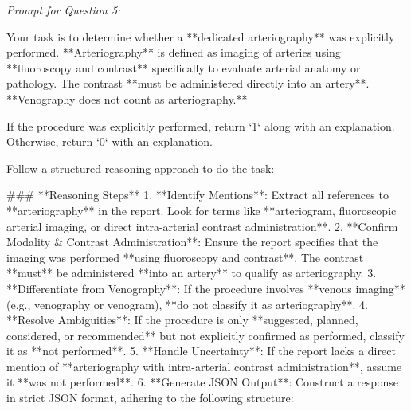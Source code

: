 \textit{\normalsize Prompt for Question  5:}
\begin{mdframed}[]
\normalsize

Your task is to determine whether a **dedicated arteriography** was explicitly performed. **Arteriography** is defined as imaging of arteries using **fluoroscopy and contrast** specifically to evaluate arterial anatomy or pathology. The contrast **must be administered directly into an artery**. **Venography does not count as arteriography.** 

If the procedure was explicitly performed, return `1` along with an explanation. Otherwise, return `0` with an explanation.

Follow a structured reasoning approach to do the task:

### **Reasoning Steps**  
1. **Identify Mentions**: Extract all references to **arteriography** in the report. Look for terms like **arteriogram, fluoroscopic arterial imaging, or direct intra-arterial contrast administration**.  
2. **Confirm Modality & Contrast Administration**: Ensure the report specifies that the imaging was performed **using fluoroscopy and contrast**. The contrast **must** be administered **into an artery** to qualify as arteriography.  
3. **Differentiate from Venography**: If the procedure involves **venous imaging** (e.g., venography or venogram), **do not classify it as arteriography**.  
4. **Resolve Ambiguities**: If the procedure is only **suggested, planned, considered, or recommended** but not explicitly confirmed as performed, classify it as **not performed**.  
5. **Handle Uncertainty**: If the report lacks a direct mention of **arteriography with intra-arterial contrast administration**, assume it **was not performed**.  
6. **Generate JSON Output**: Construct a response in strict JSON format, adhering to the following structure:  
\end{mdframed}

